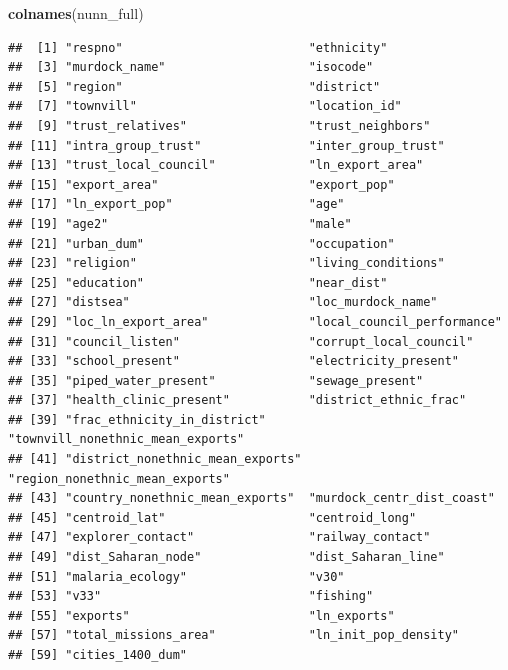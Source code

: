 \documentclass[]{book}
\newenvironment{Shaded}{\begin{snugshade}}{\end{snugshade}}
\newcommand{\KeywordTok}[1]{\textcolor[rgb]{0.13,0.29,0.53}{\textbf{#1}}}
\newcommand{\NormalTok}[1]{#1}
\theoremstyle{definition}
\theoremstyle{definition}
\theoremstyle{definition}
\theoremstyle{remark}
\begin{document}
\begin{Shaded}
\begin{Highlighting}[]
\KeywordTok{colnames}\NormalTok{(nunn\_full)}
\end{Highlighting}
\end{Shaded}

\begin{verbatim}
##  [1] "respno"                          "ethnicity"                      
##  [3] "murdock_name"                    "isocode"                        
##  [5] "region"                          "district"                       
##  [7] "townvill"                        "location_id"                    
##  [9] "trust_relatives"                 "trust_neighbors"                
## [11] "intra_group_trust"               "inter_group_trust"              
## [13] "trust_local_council"             "ln_export_area"                 
## [15] "export_area"                     "export_pop"                     
## [17] "ln_export_pop"                   "age"                            
## [19] "age2"                            "male"                           
## [21] "urban_dum"                       "occupation"                     
## [23] "religion"                        "living_conditions"              
## [25] "education"                       "near_dist"                      
## [27] "distsea"                         "loc_murdock_name"               
## [29] "loc_ln_export_area"              "local_council_performance"      
## [31] "council_listen"                  "corrupt_local_council"          
## [33] "school_present"                  "electricity_present"            
## [35] "piped_water_present"             "sewage_present"                 
## [37] "health_clinic_present"           "district_ethnic_frac"           
## [39] "frac_ethnicity_in_district"      "townvill_nonethnic_mean_exports"
## [41] "district_nonethnic_mean_exports" "region_nonethnic_mean_exports"  
## [43] "country_nonethnic_mean_exports"  "murdock_centr_dist_coast"       
## [45] "centroid_lat"                    "centroid_long"                  
## [47] "explorer_contact"                "railway_contact"                
## [49] "dist_Saharan_node"               "dist_Saharan_line"              
## [51] "malaria_ecology"                 "v30"                            
## [53] "v33"                             "fishing"                        
## [55] "exports"                         "ln_exports"                     
## [57] "total_missions_area"             "ln_init_pop_density"            
## [59] "cities_1400_dum"
\end{verbatim}
\end{document}
